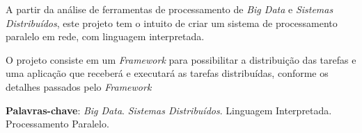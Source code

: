 \documentclass[
		12pt,				%
		openright,			%
		oneside,			%
		a4paper,			%
		chapter=TITLE,		%
		english,			%
		brazil				%
	]{abntex2}
\newif\iffinal
\newif\ifresumo
\begin{document}







\ifresumo
	\setlength{\absparsep}{18pt} %
	\begin{resumo}
			A partir da análise de ferramentas de processamento de \emph{Big Data} e
			\emph{Sistemas Distribuídos}, este projeto tem o intuito de criar um
			sistema de processamento paralelo em rede, com linguagem interpretada.

			O projeto consiste em um \emph{Framework} para possibilitar a distribuição das
			tarefas e uma aplicação que receberá e executará as tarefas distribuídas,
			conforme os detalhes passados pelo \emph{Framework}

		\textbf{Palavras-chave}: \emph{Big Data}. \emph{Sistemas Distribuídos}. Linguagem Interpretada. Processamento Paralelo.

	\end{resumo}

\end{document}
